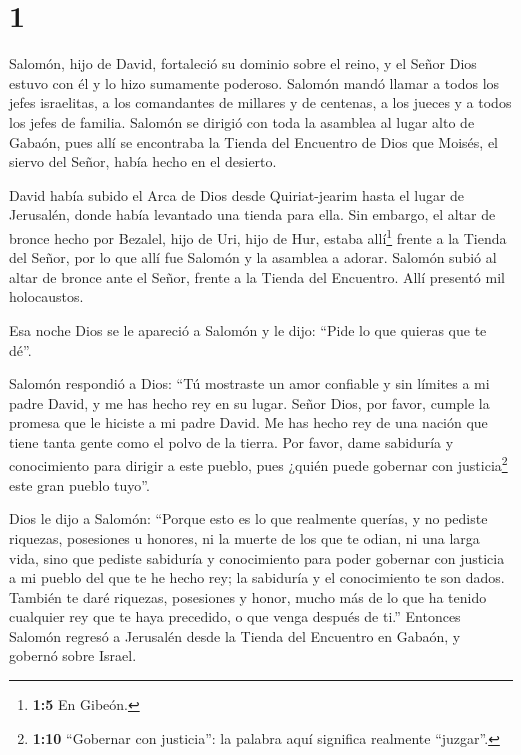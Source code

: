 \hypertarget{section}{%
\section{1}\label{section}}

 Salomón, hijo de David, fortaleció su dominio sobre el
reino, y el Señor Dios estuvo con él y lo hizo sumamente poderoso.
 Salomón mandó llamar a todos los jefes israelitas, a los
comandantes de millares y de centenas, a los jueces y a todos los jefes
de familia.  Salomón se dirigió con toda la asamblea al
lugar alto de Gabaón, pues allí se encontraba la Tienda del Encuentro de
Dios que Moisés, el siervo del Señor, había hecho en el desierto.

 David había subido el Arca de Dios desde Quiriat-jearim
hasta el lugar de Jerusalén, donde había levantado una tienda para ella.
 Sin embargo, el altar de bronce hecho por Bezalel, hijo de
Uri, hijo de Hur, estaba allí\footnote{\textbf{1:5} En Gibeón.} frente a
la Tienda del Señor, por lo que allí fue Salomón y la asamblea a adorar.
 Salomón subió al altar de bronce ante el Señor, frente a la
Tienda del Encuentro. Allí presentó mil holocaustos.

 Esa noche Dios se le apareció a Salomón y le dijo: ``Pide
lo que quieras que te dé''.

 Salomón respondió a Dios: ``Tú mostraste un amor confiable
y sin límites a mi padre David, y me has hecho rey en su lugar.
 Señor Dios, por favor, cumple la promesa que le hiciste a
mi padre David. Me has hecho rey de una nación que tiene tanta gente
como el polvo de la tierra.  Por favor, dame sabiduría y
conocimiento para dirigir a este pueblo, pues ¿quién puede gobernar con
justicia\footnote{\textbf{1:10} ``Gobernar con justicia'': la palabra
  aquí significa realmente ``juzgar''.} este gran pueblo tuyo''.

 Dios le dijo a Salomón: ``Porque esto es lo que realmente
querías, y no pediste riquezas, posesiones u honores, ni la muerte de
los que te odian, ni una larga vida, sino que pediste sabiduría y
conocimiento para poder gobernar con justicia a mi pueblo del que te he
hecho rey;  la sabiduría y el conocimiento te son dados.
También te daré riquezas, posesiones y honor, mucho más de lo que ha
tenido cualquier rey que te haya precedido, o que venga después de ti.''
 Entonces Salomón regresó a Jerusalén desde la Tienda del
Encuentro en Gabaón, y gobernó sobre Israel.

